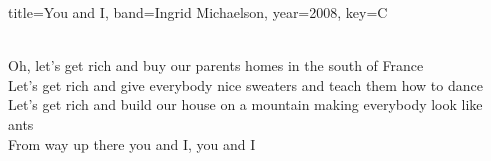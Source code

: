 \documentclass{bekki-leadsheet}
\begin{document}
\begin{song}{title={You and I}, band={Ingrid Michaelson}, year={2008}, key={C}}
\begin{outro}
 \\ 
Oh, let’s get rich and buy our parents homes in the south of France \\
Let's get rich and give everybody nice sweaters and teach them how to dance \\
Let's get rich and build our house on a mountain making everybody look like ants \\
From way up there you and I, you and I
\end{outro}

\end{song}
\end{document}
